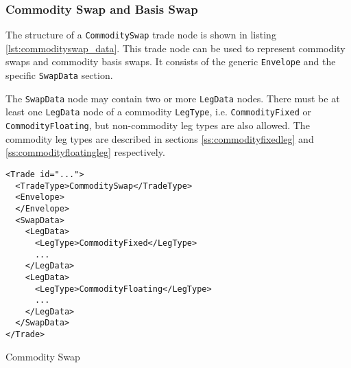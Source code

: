 \subsubsection{Commodity Swap and Basis Swap}
\label{ss:input_commodityswap}

The structure of a \lstinline!CommoditySwap! trade node is shown in listing \ref{lst:commodityswap_data}. This trade node can be used to represent commodity swaps and commodity basis swaps. It consists of the generic \lstinline!Envelope! and the specific \lstinline!SwapData! section. 

The \lstinline!SwapData! node may contain two or more \lstinline!LegData! nodes. There must be at least one \lstinline!LegData! node of a commodity  \lstinline!LegType!, i.e. \lstinline!CommodityFixed! or \lstinline!CommodityFloating!, but non-commodity leg types are also allowed. The commodity leg types are described in sections \ref{ss:commodityfixedleg} and \ref{ss:commodityfloatingleg} respectively.

\begin{listing}[h!]
\begin{verbatim}
<Trade id="...">
  <TradeType>CommoditySwap</TradeType>
  <Envelope>
  </Envelope>
  <SwapData>
    <LegData>
      <LegType>CommodityFixed</LegType>
      ...
    </LegData>
    <LegData>
      <LegType>CommodityFloating</LegType>
      ...
    </LegData>
  </SwapData>
</Trade>
\end{verbatim}
\caption{Commodity Swap}
\label{lst:commodityswap_data}
\end{listing}


